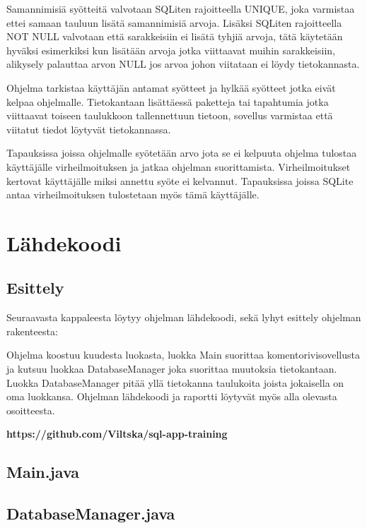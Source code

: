 \documentclass[11pt,a4paper]{article}
\begin{document}
Samannimisiä syötteitä valvotaan SQLiten rajoitteella UNIQUE, joka varmistaa ettei samaan tauluun lisätä samannimisiä arvoja. Lisäksi SQLiten rajoitteella NOT NULL valvotaan että sarakkeisiin ei lisätä tyhjiä arvoja, tätä käytetään hyväksi esimerkiksi kun lisätään arvoja jotka viittaavat muihin sarakkeisiin, alikysely palauttaa arvon NULL jos arvoa johon viitataan ei löydy tietokannasta.
 
Ohjelma tarkistaa käyttäjän antamat syötteet ja hylkää syötteet jotka eivät kelpaa ohjelmalle. Tietokantaan lisättäessä paketteja tai tapahtumia jotka viittaavat toiseen taulukkoon tallennettuun tietoon, sovellus varmistaa että viitatut tiedot löytyvät tietokannassa.

Tapauksissa joissa ohjelmalle syötetään arvo jota se ei kelpuuta ohjelma tulostaa käyttäjälle virheilmoituksen ja jatkaa ohjelman suorittamista. Virheilmoitukset kertovat käyttäjälle miksi annettu syöte ei kelvannut. Tapauksissa joissa SQLite antaa virheilmoituksen tulostetaan myös tämä käyttäjälle. 

\newpage
\section{Lähdekoodi}

\subsection*{Esittely}
Seuraavasta kappaleesta löytyy ohjelman lähdekoodi, sekä lyhyt esittely ohjelman rakenteesta:

Ohjelma koostuu kuudesta luokasta, luokka Main suorittaa komentorivisovellusta ja kutsuu luokkaa DatabaseManager joka suorittaa muutoksia tietokantaan. Luokka DatabaseManager pitää yllä tietokanna taulukoita joista jokaisella on oma luokkansa. Ohjelman lähdekoodi ja raportti löytyvät myös alla olevasta osoitteesta.

\begin{center}
\textbf{https://github.com/Viltska/sql-app-training}
\end{center}
\newpage

\subsection*{Main.java}

\newpage

\subsection*{DatabaseManager.java}

\newpage
\end{document}
